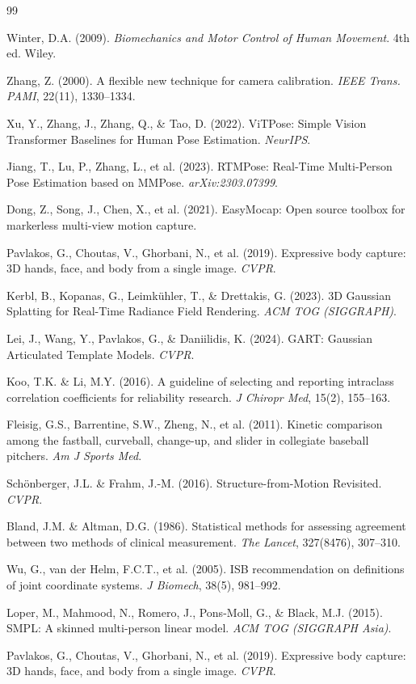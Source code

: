 \documentclass[11pt, a4paper]{report}
\begin{document}
\begin{thebibliography}{99}

Winter, D.A. (2009). \textit{Biomechanics and Motor Control of Human Movement}. 4th ed. Wiley.

Zhang, Z. (2000). A flexible new technique for camera calibration. \textit{IEEE Trans. PAMI}, 22(11), 1330--1334.

Xu, Y., Zhang, J., Zhang, Q., \& Tao, D. (2022). ViTPose: Simple Vision Transformer Baselines for Human Pose Estimation. \textit{NeurIPS}.

Jiang, T., Lu, P., Zhang, L., et al. (2023). RTMPose: Real-Time Multi-Person Pose Estimation based on MMPose. \textit{arXiv:2303.07399}.

Dong, Z., Song, J., Chen, X., et al. (2021). EasyMocap: Open source toolbox for markerless multi-view motion capture.

Pavlakos, G., Choutas, V., Ghorbani, N., et al. (2019). Expressive body capture: 3D hands, face, and body from a single image. \textit{CVPR}.

Kerbl, B., Kopanas, G., Leimk\"uhler, T., \& Drettakis, G. (2023). 3D Gaussian Splatting for Real-Time Radiance Field Rendering. \textit{ACM TOG (SIGGRAPH)}.

Lei, J., Wang, Y., Pavlakos, G., \& Daniilidis, K. (2024). GART: Gaussian Articulated Template Models. \textit{CVPR}.

Koo, T.K. \& Li, M.Y. (2016). A guideline of selecting and reporting intraclass correlation coefficients for reliability research. \textit{J Chiropr Med}, 15(2), 155--163.

Fleisig, G.S., Barrentine, S.W., Zheng, N., et al. (2011). Kinetic comparison among the fastball, curveball, change-up, and slider in collegiate baseball pitchers. \textit{Am J Sports Med}.

Sch\"onberger, J.L. \& Frahm, J.-M. (2016). Structure-from-Motion Revisited. \textit{CVPR}.

Bland, J.M. \& Altman, D.G. (1986). Statistical methods for assessing agreement between two methods of clinical measurement. \textit{The Lancet}, 327(8476), 307--310.

Wu, G., van der Helm, F.C.T., et al. (2005). ISB recommendation on definitions of joint coordinate systems. \textit{J Biomech}, 38(5), 981--992.

Loper, M., Mahmood, N., Romero, J., Pons-Moll, G., \& Black, M.J. (2015). SMPL: A skinned multi-person linear model. \textit{ACM TOG (SIGGRAPH Asia)}.

Pavlakos, G., Choutas, V., Ghorbani, N., et al. (2019). Expressive body capture: 3D hands, face, and body from a single image. \textit{CVPR}.

\end{thebibliography}
\end{document}
